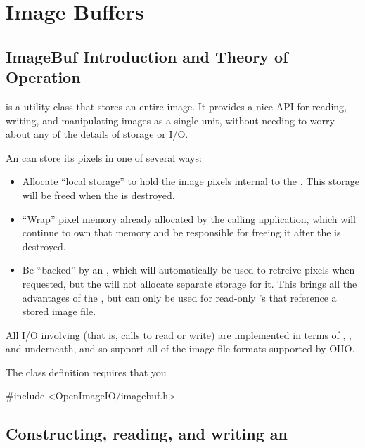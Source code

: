 \chapter{Image Buffers}
\label{chap:imagebuf}

\section{ImageBuf Introduction and Theory of Operation}
\label{sec:imagebuf:intro}

\ImageBuf is a utility class that stores an entire image.  It provides a
nice API for reading, writing, and manipulating images as a single unit,
without needing to worry about any of the details of storage or I/O.

\smallskip

\noindent An \ImageBuf can store its pixels in one of several ways:

\begin{itemize}
\item Allocate ``local storage'' to hold the image pixels
internal to the \ImageBuf.  This storage will be freed when the
\ImageBuf is destroyed.
\item ``Wrap'' pixel memory already allocated by the calling application,
which will continue to own that memory and be responsible for freeing
it after the \ImageBuf is destroyed.
\item Be ``backed'' by an \ImageCache, which will automatically be used
to retreive pixels when requested, but the \ImageBuf will not allocate
separate storage for it.  This brings all the advantages of the
\ImageCache, but can only be used for read-only \ImageBuf's that
reference a stored image file.
\end{itemize}

All I/O involving \ImageBuf (that is, calls to {\cf read} or {\cf write})
are implemented in terms of \ImageCache, \ImageInput,
and \ImageOutput underneath, and so support all of the image file
formats supported by OIIO.

\smallskip

\noindent The \ImageBuf class definition requires that you
\begin{code}
  #include <OpenImageIO/imagebuf.h>
\end{code}




\section{Constructing, reading, and writing an \ImageBuf}

